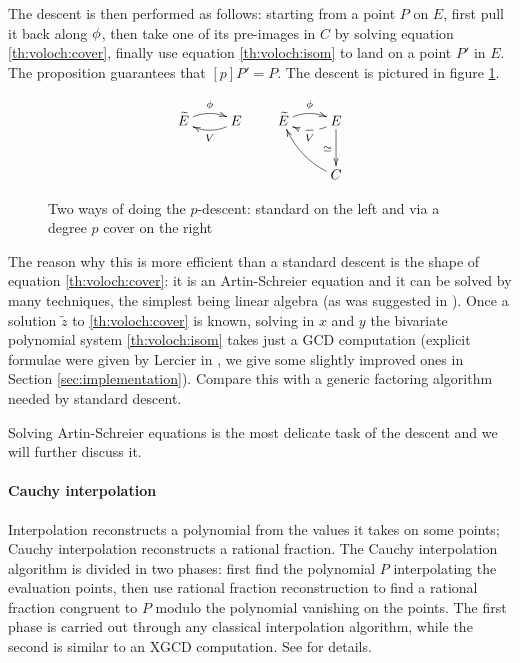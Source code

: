 The descent is then performed as follows: starting from a point $P$ on
$E$, first pull it back along $\phi$, then take one of its
pre-images in $C$ by solving equation \eqref{th:voloch:cover}, finally
use equation \eqref{th:voloch:isom} to land on a point $P'$ in $E$.
The proposition guarantees that $[p]P' = P$. The descent is pictured
in figure \ref{fig:voloch}.

\begin{figure}
  \centering
  \[
  \xymatrix{\widetilde{E}\ar@/^/[r]^{\frobisog} & E\ar@/^/[l]^{V}}
  \qquad
  \xymatrix{
    \widetilde{E}\ar@/^/[r]^{\frobisog} & E\ar@/^/@{-->}[l]^{V}\ar[d]_{\simeq}\\
    & C\ar@/^/[ul]
  }
  \]
  
  \caption{Two ways of doing the $p$-descent: standard on the left and via a degree $p$ cover on the right}
  \label{fig:voloch}
\end{figure}


The reason why this is more efficient than a standard descent is the
shape of equation \eqref{th:voloch:cover}: it is an Artin-Schreier
equation and it can be solved by many techniques, the simplest being
linear algebra (as was suggested in \cite{Cou96}). Once a solution
$\tilde{z}$ to \eqref{th:voloch:cover} is known, solving in $x$ and $y$ the
bivariate polynomial system \eqref{th:voloch:isom} takes just a GCD
computation (explicit formulae were given by Lercier in
\cite[$\S$6.2]{Ler97}, we give some slightly improved ones in Section
\ref{sec:implementation}). Compare this with a generic factoring
algorithm needed by standard descent.

Solving Artin-Schreier equations is the most delicate task of the
descent and we will further discuss it.


\paragraph{Cauchy interpolation}
Interpolation reconstructs a polynomial from the values it takes on
some points; Cauchy interpolation reconstructs a rational
fraction. The Cauchy interpolation algorithm is divided in two phases:
first find the polynomial $P$ interpolating the evaluation points,
then use rational fraction reconstruction to find a rational fraction
congruent to $P$ modulo the polynomial vanishing on the points. The
first phase is carried out through any classical interpolation
algorithm, while the second is similar to an XGCD computation. See
\cite[$\S$5.8]{vzGG} for details.

